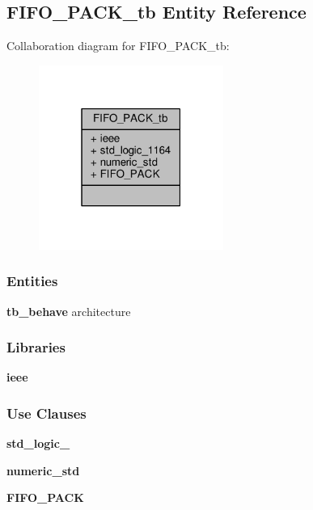 \subsection{F\+I\+F\+O\+\_\+\+P\+A\+C\+K\+\_\+tb Entity Reference}
\label{classFIFO__PACK__tb}


Collaboration diagram for F\+I\+F\+O\+\_\+\+P\+A\+C\+K\+\_\+tb\+:\nopagebreak
\begin{figure}[H]
\begin{center}
\leavevmode
\includegraphics[width=171pt]{d7/d33/classFIFO__PACK__tb__coll__graph}
\end{center}
\end{figure}
\subsubsection*{Entities}
\begin{DoxyCompactItemize}
\item 
{\bf tb\+\_\+behave} architecture
\end{DoxyCompactItemize}
\subsubsection*{Libraries}
 \begin{DoxyCompactItemize}
\item 
{\bf ieee} 
\end{DoxyCompactItemize}
\subsubsection*{Use Clauses}
 \begin{DoxyCompactItemize}
\item 
{\bf std\+\_\+logic\+\_}   
\item 
{\bf numeric\+\_\+std}   
\item 
{\bf F\+I\+F\+O\+\_\+\+P\+A\+CK}   
\end{DoxyCompactItemize}


